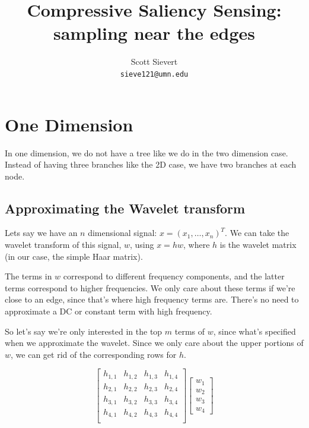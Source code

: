 \documentclass[leqno]{article}
\title{Compressive Saliency Sensing: sampling near the edges}
\date{}
\author{Scott Sievert\\ \texttt{sieve121@umn.edu}}
\begin{document}
    \maketitle
    {\hypersetup{linkcolor=blue} \tableofcontents}
    \hrulefill

    \section{One Dimension}
        In one dimension, we do not have a tree like we do in the two dimension case. Instead of having three branches like the 2D case, we have two branches at each node.

        \subsection{Approximating the Wavelet transform}

          
          Lets say we have an $n$ dimensional signal: $x = (x_1,\ldots,x_n)^T$. We can take the wavelet transform of this signal, $w$, using $x = h w$, where $h$ is the wavelet matrix (in our case, the simple Haar matrix).


            The terms in $w$ correspond to different frequency components, and the latter terms correspond to higher frequencies. We only care about these terms if we're close to an edge, since that's where high frequency terms are. There's no need to approximate a DC or constant term with high frequency.

            So let's say we're only interested in the top $m$ terms of $w$, since what's specified when we approximate the wavelet. Since we only care about the upper portions of $w$, we can get rid of the corresponding rows for $h$.

            $$ 
                \begin{bmatrix}  
                    h_{1,1} & h_{1,2} &h_{1,3} &h_{1,4} \\
                    h_{2,1} & h_{2,2} &h_{2,3} &h_{2,4} \\
                    h_{3,1} & h_{3,2} &h_{3,3} &h_{3,4} \\
                    h_{4,1} & h_{4,2} &h_{4,3} &h_{4,4} \\
                
                \end{bmatrix}
                \begin{bmatrix}
                    w_1 \\ w_2 \\ w_3 \\ w_4
                \end{bmatrix}
            $$
\end{document}
